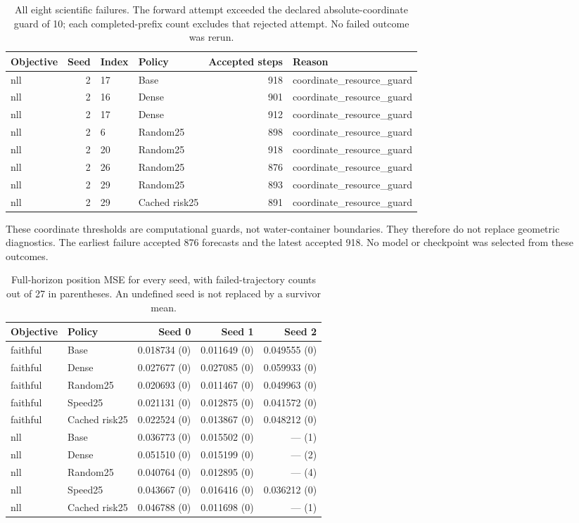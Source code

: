 \begin{table}[t]
\centering\small
\caption{All eight scientific failures. The forward attempt exceeded the declared absolute-coordinate guard of 10; each completed-prefix count excludes that rejected attempt. No failed outcome was rerun.}
\label{tab:full-failures}
\begin{tabular}{lrllrl}
\toprule
Objective & Seed & Index & Policy & Accepted steps & Reason\\
\midrule
nll & 2 & 17 & Base & 918 & coordinate\_resource\_guard\\
nll & 2 & 16 & Dense & 901 & coordinate\_resource\_guard\\
nll & 2 & 17 & Dense & 912 & coordinate\_resource\_guard\\
nll & 2 & 6 & Random25 & 898 & coordinate\_resource\_guard\\
nll & 2 & 20 & Random25 & 918 & coordinate\_resource\_guard\\
nll & 2 & 26 & Random25 & 876 & coordinate\_resource\_guard\\
nll & 2 & 29 & Random25 & 893 & coordinate\_resource\_guard\\
nll & 2 & 29 & Cached risk25 & 891 & coordinate\_resource\_guard\\
\bottomrule
\end{tabular}
\end{table}


These coordinate thresholds are computational guards, not water-container
boundaries. They therefore do not replace geometric diagnostics. The earliest
failure accepted 876 forecasts and the latest accepted 918. No model or
checkpoint was selected from these outcomes.


\begin{table}[t]
\centering\small
\caption{Full-horizon position MSE for every seed, with failed-trajectory counts out of 27 in parentheses. An undefined seed is not replaced by a survivor mean.}
\label{tab:full-seeds}
\begin{tabular}{llrrr}
\toprule
Objective & Policy & Seed 0 & Seed 1 & Seed 2\\
\midrule
faithful & Base & 0.018734 (0) & 0.011649 (0) & 0.049555 (0)\\
faithful & Dense & 0.027677 (0) & 0.027085 (0) & 0.059933 (0)\\
faithful & Random25 & 0.020693 (0) & 0.011467 (0) & 0.049963 (0)\\
faithful & Speed25 & 0.021131 (0) & 0.012875 (0) & 0.041572 (0)\\
faithful & Cached risk25 & 0.022524 (0) & 0.013867 (0) & 0.048212 (0)\\
nll & Base & 0.036773 (0) & 0.015502 (0) & --- (1)\\
nll & Dense & 0.051510 (0) & 0.015199 (0) & --- (2)\\
nll & Random25 & 0.040764 (0) & 0.012895 (0) & --- (4)\\
nll & Speed25 & 0.043667 (0) & 0.016416 (0) & 0.036212 (0)\\
nll & Cached risk25 & 0.046788 (0) & 0.011698 (0) & --- (1)\\
\bottomrule
\end{tabular}
\end{table}


